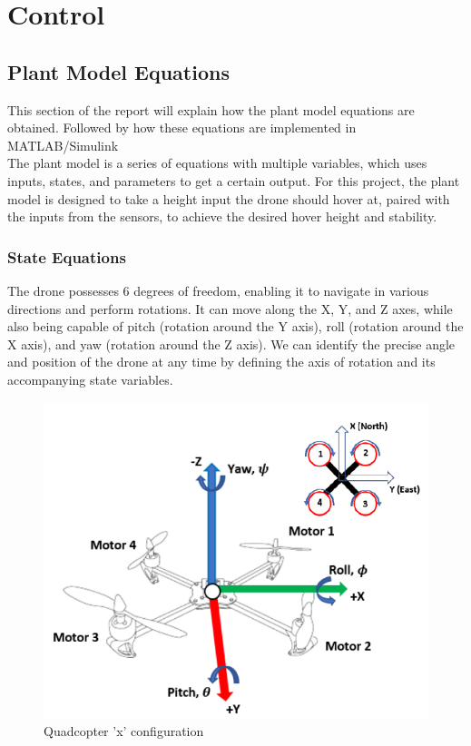 \section{Control}
\subsection{Plant Model Equations}
This section of the report will explain how the plant model equations are obtained. Followed by how these equations are implemented in MATLAB/Simulink \\

The plant model is a series of equations with multiple variables, which uses inputs, states, and parameters to get a certain output. 
For this project, the plant model is designed to take a height input the drone should hover at, paired with the inputs from the sensors, to achieve the desired hover height and stability.

\subsubsection{State Equations}
The drone possesses 6 degrees of freedom, enabling it to navigate in various directions and perform rotations. It can move along the X, Y, and Z axes, while also being capable of pitch (rotation around the Y axis), roll (rotation around the X axis), and yaw (rotation around the Z axis). We can identify the precise angle and position of the drone at any time by defining the axis of rotation and its accompanying state variables.
\cite{Ferry}

\begin{figure}[H]
\begin{center}
    \includegraphics[scale =0.7]{pictures/control/drone directionals.png}
\end{center}
\caption{Quadcopter 'x' configuration}
\end{figure}

